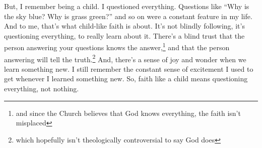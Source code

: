 \documentclass[12pt]{article}[titlepage]
\newcommand{\say}[1]{``#1''}
\newcommand{\1}{\={a}}
\newcommand{\2}{\={e}}
\newcommand{\3}{\={\i}}
\newcommand{\4}{\=o}
\newcommand{\5}{\=u}
\newcommand{\6}{\={A}}
\renewcommand{\,}{\textsuperscript{,}}
\begin{document}
But, I remember being a child.
I questioned everything.
Questions like \say{Why is the sky blue? Why is grass green?} and so on were a constant feature in my life.
And to me, that's what child-like faith is about.
It's not blindly following, it's questioning everything, to really learn about it.
There's a blind trust that the person answering your questions knows the answer,\footnote{and since the Church believes that God knows everything, the faith isn't misplaced} and that the person answering will tell the truth.\footnote{which hopefully isn't theologically controversial to say God does}
And, there's a sense of joy and wonder when we learn something new.
I still remember the constant sense of excitement I used to get whenever I learned something new.
So, faith like a child means questioning everything, not nothing.
\end{document}
